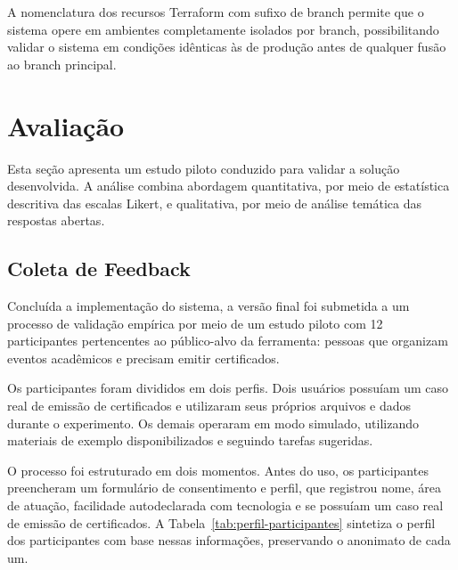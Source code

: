 \documentclass[article,a4paper,12pt,brazil,sumario=tradicional]{abntex2}
\begin{document}
A nomenclatura dos recursos Terraform com sufixo de branch permite que o sistema opere em ambientes completamente isolados por branch, possibilitando validar o sistema em condições idênticas às de produção antes de qualquer fusão ao branch principal.

\section{Avaliação}\label{sec:avaliacao}

Esta seção apresenta um estudo piloto conduzido para validar a solução desenvolvida. A análise combina abordagem quantitativa, por meio de estatística descritiva das escalas Likert, e qualitativa, por meio de análise temática das respostas abertas.

\subsection{Coleta de Feedback}

Concluída a implementação do sistema, a versão final foi submetida a um processo de validação empírica por meio de um estudo piloto com 12 participantes pertencentes ao público-alvo da ferramenta: pessoas que organizam eventos acadêmicos e precisam emitir certificados.

Os participantes foram divididos em dois perfis. Dois usuários possuíam um caso real de emissão de certificados e utilizaram seus próprios arquivos e dados durante o experimento. Os demais operaram em modo simulado, utilizando materiais de exemplo disponibilizados e seguindo tarefas sugeridas.

O processo foi estruturado em dois momentos. Antes do uso, os participantes preencheram um formulário de consentimento e perfil, que registrou nome, área de atuação, facilidade autodeclarada com tecnologia e se possuíam um caso real de emissão de certificados. A Tabela~\ref{tab:perfil-participantes} sintetiza o perfil dos participantes com base nessas informações, preservando o anonimato de cada um.
\end{document}
